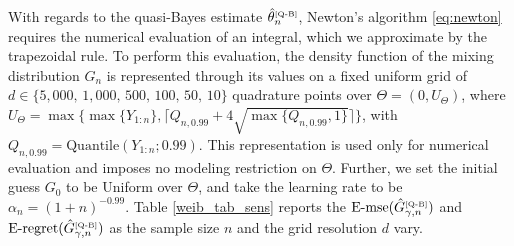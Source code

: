 \documentclass[twoside,12pt]{article}
\begin{document}
With regards to the quasi-Bayes estimate $\hat{\theta}^{\text{\tiny{[Q-B]}}}_{n}$,  Newton's algorithm \eqref{eq:newton} requires the numerical evaluation of an integral, which we approximate by the trapezoidal rule. To perform this evaluation, the density function of the mixing distribution $G_{n}$ is represented through its values on a fixed uniform grid of $d\in\{5,000,\,1,000,\,500,\,100,\,50,\,10\}$ quadrature points over $\Theta=(0,U_{\Theta})$, where $U_\Theta=\max\{\max\{Y_{1:n}\},\lceil Q_{n,0.99}+4\sqrt{\max\{Q_{n,0.99},1\}}\rceil\}$, with $Q_{n,0.99}=\text{Quantile}(Y_{1:n};0.99)$. This representation is used only for numerical evaluation and imposes no modeling restriction on $\Theta$. Further, we set the initial guess $G_{0}$ to be Uniform over $\Theta$, and take the learning rate to be $\alpha_{n}=(1+n)^{-0.99}$. Table \ref{weib_tab_sens} reports the $\mathrm{E\text{-}mse}(\hat{G}_{\gamma,n}^{\text{\tiny{[Q-B]}}})$ and $\mathrm{E\text{-}regret}(\hat{G}_{\gamma,n}^{\text{\tiny{[Q-B]}}})$ as the sample size $n$ and the grid resolution $d$ vary.
\end{document}
